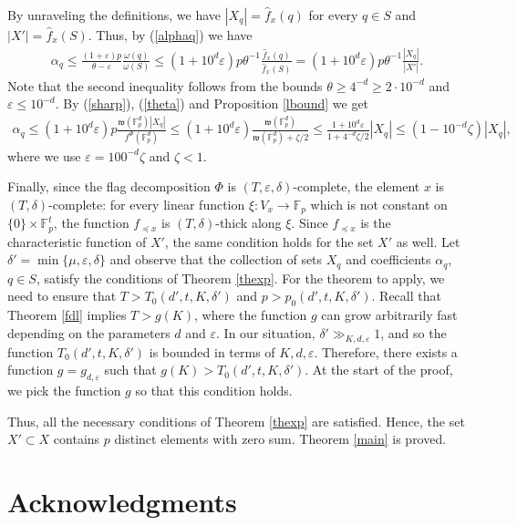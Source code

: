 \documentclass{daj}
\renewcommand{\le}{\leqslant}
\renewcommand{\ge}{\geqslant}
\newcommand{\w}{\mathfrak w}
\newcommand{\FF}{\mathbb F}
\theoremstyle{definition}
\theoremstyle{remark}
\theoremstyle{definition}
\theoremstyle{definition}
\begin{document}
By unraveling the definitions, we have $|X_q| = \hat f_x(q)$ for every $q \in S$ and $|X'| = \hat f_x(S)$. Thus, by (\ref{alphaq}) we have
\begin{align*}
\alpha_q \le \frac{(1+\varepsilon) p}{\theta-\varepsilon} \frac{\omega(q)}{\omega(S)} \le (1+ 10^d \varepsilon) p \theta^{-1} \frac{\hat f_x(q)}{\hat f_x(S)}= (1+ 10^d \varepsilon) p \theta^{-1} \frac{|X_q|}{|X'|}.
\end{align*}
Note that the second inequality follows from the bounds $\theta \ge 4^{-d} \ge 2 \cdot 10^{-d}$ and $\varepsilon \le 10^{-d}$. 
By (\ref{sharp}), (\ref{theta}) and Proposition \ref{lbound} we get
\begin{align*}
    \alpha_q \le (1+ 10^d \varepsilon) p \frac{\w(\FF_p^d) |X_q|}{f^\Phi(\FF_p^d)} \le (1+ 10^d \varepsilon) \frac{\w(\FF_p^d)}{\w(\FF_p^d) +\zeta/2}  \le \frac{1+10^d\varepsilon}{1+4^{-d}\zeta/2} |X_q| \le (1-10^{-d}\zeta) |X_q|,
\end{align*}
where we use $\varepsilon = 100^{-d}\zeta$ and $\zeta<1$. 

Finally, since the flag decomposition $\Phi$ is $(T, \varepsilon, \delta)$-complete, the element $x$ is $(T, \delta)$-complete: for every linear function $\xi: V_x \rightarrow \FF_p$ which is not constant on $\{0\}\times \FF_p^t$, the function $f_{\preceq x}$ is $(T, \delta)$-thick along $\xi$. Since $f_{\preceq x}$ is the characteristic function of $X'$, the same condition holds for the set $X'$ as well. Let $\delta' = \min\{\mu, \varepsilon, \delta\}$ and observe that the collection of sets $X_q$ and coefficients $\alpha_q$, $q\in S$, satisfy the conditions of Theorem \ref{thexp}.
For the theorem to apply, we need to ensure that $T > T_0(d', t, K, \delta')$ and $p > p_0(d', t, K, \delta')$. Recall that Theorem \ref{fdl} implies $T > g(K)$, where the function $g$ can grow arbitrarily fast depending on the parameters $d$ and $\varepsilon$. In our situation, $\delta' \gg_{K, d, \varepsilon} 1$, and so the function $T_0(d', t, K, \delta')$ is bounded in terms of $K, d, \varepsilon$. Therefore, there exists a function $g = g_{d, \varepsilon}$ such that $g(K) > T_0(d', t, K, \delta')$. At the start of the proof, we pick the function $g$ so that this condition holds. 

Thus, all the necessary conditions of Theorem \ref{thexp} are satisfied. Hence, the set $X' \subset X$ contains $p$ distinct elements with zero sum. Theorem \ref{main} is proved.

\section*{Acknowledgments}
\end{document}
